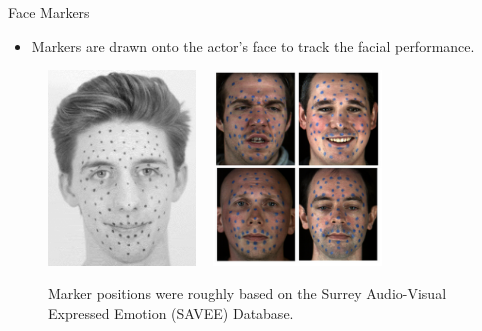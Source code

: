 \documentclass{beamer}
\begin{document}
\begin{frame}{Face Markers}

\begin{itemize}
\setlength\itemsep{0.5em}
\item Markers are drawn onto the actor's face to track the facial performance.
\end{itemize}

\begin{center}
\begin{figure}
\includegraphics[width=0.35\textwidth]{img/facemarkers} ~
\includegraphics[width=0.4\textwidth]{img/surreydata}
\caption{\tiny{Marker positions were roughly based on the Surrey Audio-Visual Expressed Emotion (SAVEE) Database.}}
\end{figure}
\end{center}

\end{frame}
\end{document}

